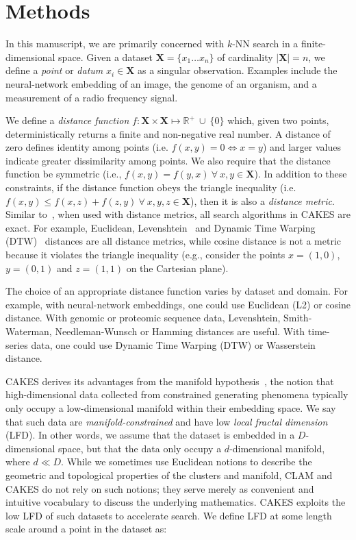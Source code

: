 \section{Methods}
\label{sec:methods}

In this manuscript, we are primarily concerned with $k$-NN search in a finite-dimensional space.
Given a dataset $\textbf{X} = \{x_1 \dots x_n\}$ of cardinality $|\textbf{X}| = n$, we define a \textit{point} or \textit{datum} $x_i \in \textbf{X}$ as a singular observation. Examples include the neural-network embedding of an image, the genome of an organism, and a measurement of a radio frequency signal.

We define a \textit{distance function} $f : \textbf{X} \times \textbf{X} \mapsto \mathbb{R}^+ \ \cup \ \{0\}$ which, given two points, deterministically returns a finite and non-negative real number.
A distance of zero defines identity among points (i.e. $f(x, y) = 0 \Leftrightarrow x = y$) and larger values indicate greater dissimilarity among points.
We also require that the distance function be symmetric (i.e., $f(x, y) = f(y, x) \ \forall \ x, y \in \textbf{X}$).
In addition to these constraints, if the distance function obeys the triangle inequality (i.e. $f(x, y) \leq f(x, z) + f(z, y) \ \forall \ x, y, z \in \textbf{X}$), then it is also a \textit{distance metric}.
Similar to~\cite{yu2015entropy}, when used with distance metrics, all search algorithms in CAKES are exact.
For example, Euclidean, Levenshtein~\cite{levenshtein1966binary} and Dynamic Time Warping (DTW)~\cite{muller2007dynamic} distances are all distance metrics, while cosine distance is not a metric because it violates the triangle inequality (e.g., consider the points $x = (1, 0)$, $y = (0, 1)$ and $z = (1, 1)$ on the Cartesian plane).

The choice of an appropriate distance function varies by dataset and domain.
For example, with neural-network embeddings, one could use Euclidean (L2) or cosine distance.
With genomic or proteomic sequence data, Levenshtein, Smith-Waterman, Needleman-Wunsch or Hamming distances are useful.
With time-series data, one could use Dynamic Time Warping (DTW) or Wasserstein distance.

CAKES derives its advantages from the manifold hypothesis~\cite{fefferman2016testing}, the notion that high-dimensional data collected from constrained generating phenomena typically only occupy a low-dimensional manifold within their embedding space.
We say that such data are \textit{manifold-constrained} and have low \textit{local fractal dimension} (LFD).
In other words, we assume that the dataset is embedded in a $D$-dimensional space, but that the data only occupy a $d$-dimensional manifold, where $d \ll D$.
While we sometimes use Euclidean notions to describe the geometric and topological properties of the clusters and manifold, CLAM and CAKES do not rely on such notions;
they serve merely as convenient and intuitive vocabulary to discuss the underlying mathematics.
CAKES exploits the low LFD of such datasets to accelerate search.
We define LFD at some length scale around a point in the dataset as:


